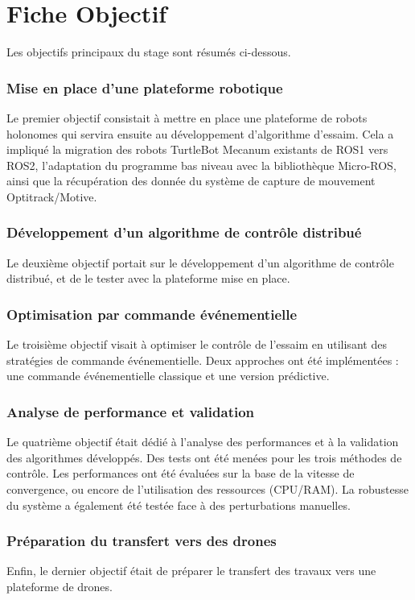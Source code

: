 \chapter*{Fiche Objectif}

\noindent Les objectifs principaux du stage sont résumés ci-dessous.

\subsection*{Mise en place d'une plateforme robotique}
Le premier objectif consistait à mettre en place une plateforme de robots holonomes qui servira ensuite au développement d'algorithme d'essaim. Cela a impliqué la migration des robots TurtleBot Mecanum existants de ROS1 vers ROS2, l'adaptation du programme bas niveau avec la bibliothèque Micro-ROS, ainsi que la récupération des donnée du système de capture de mouvement Optitrack/Motive. 
\subsection*{Développement d'un algorithme de contrôle distribué}
Le deuxième objectif portait sur le développement d'un algorithme de contrôle distribué, et de le tester avec la plateforme mise en place. 

\subsection*{Optimisation par commande événementielle}
Le troisième objectif visait à optimiser le contrôle de l'essaim en utilisant des stratégies de commande événementielle. Deux approches ont été implémentées : une commande événementielle classique et une version prédictive.

\subsection*{Analyse de performance et validation}
Le quatrième objectif était dédié à l'analyse des performances et à la validation des algorithmes développés. Des tests ont été menées pour les trois méthodes de contrôle. Les performances ont été évaluées sur la base de la vitesse de convergence, ou encore de l'utilisation des ressources (CPU/RAM). La robustesse du système a également été testée face à des perturbations manuelles.

\subsection*{Préparation du transfert vers des drones}
Enfin, le dernier objectif était de préparer le transfert des travaux vers une plateforme de drones. 


